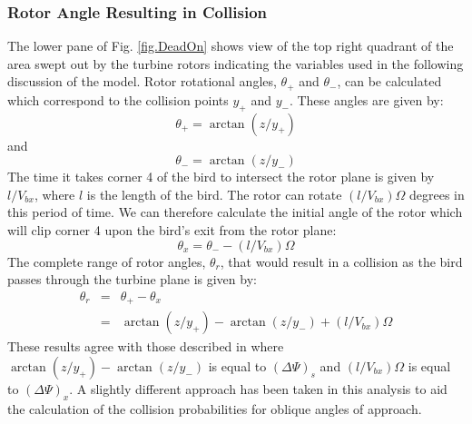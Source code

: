 \label{} \documentclass[10pt,conference]{IEEEtran}
\begin{document}
\subsubsection{Rotor Angle Resulting in Collision}
The lower pane of Fig. \ref{fig.DeadOn} shows view of the top right quadrant of the area swept out by the turbine
rotors indicating the variables used in the following discussion of the model. Rotor rotational angles, $\theta_+$ and
$\theta_-$, can be calculated which correspond to the collision points $y_+$ and $y_-$. These angles are given by:
\begin{equation*}
    \theta_+ = \arctan(z/y_+)
\end{equation*}
and
\begin{equation*}
    \theta_- = \arctan(z/y_-)
\end{equation*}
The time it takes corner 4 of the bird to intersect the rotor plane is given by $l/V_{bx}$, where $l$ is the length of
the bird. The rotor can rotate $(l/V_{bx})\Omega$ degrees in this period of time. We can therefore calculate the
initial angle of the rotor which will clip corner 4 upon the bird's exit from the rotor plane:
\begin{equation*}
    \theta_x = \theta_- - (l/V_{bx})\Omega
\end{equation*}
The complete range of rotor angles, $\theta_r$, that would result in a collision as the bird passes through the turbine
plane is given by:
\begin{eqnarray}
\nonumber    \theta_r &=& \theta_+ - \theta_x\\
             &=& \arctan(z/y_+) - \arctan(z/y_-) + (l/V_{bx})\Omega
\end{eqnarray}
These results agree with those described in \cite{Tucker1996} where $\arctan(z/y_+) - \arctan(z/y_-)$ is equal to
$(\Delta\Psi)_s$ and $(l/V_{bx})\Omega$ is equal to $(\Delta\Psi)_x$. A slightly different approach has been taken in
this analysis to aid the calculation of the collision probabilities for oblique angles of approach.
\end{document}
